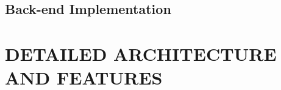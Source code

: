 \documentclass[10pt, onecolumn]{witseiepaper}
\begin{document}
\subsection{Back-end Implementation}

\section{DETAILED ARCHITECTURE AND FEATURES}





%



\end{document}
